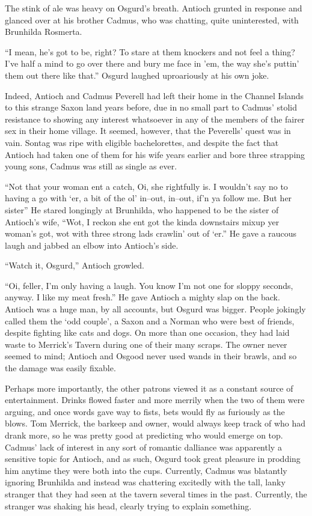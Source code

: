 The stink of ale was heavy on Osgurd’s breath. Antioch grunted in response and glanced over at his brother Cadmus, who was chatting, quite uninterested, with Brunhilda Rosmerta.

“I mean, he’s got to be, right? To stare at them knockers and not feel a thing? I’ve half a mind to go over there and bury me face in ’em, the way she’s puttin’ them out there like that.” Osgurd laughed uproariously at his own joke.

Indeed, Antioch and Cadmus Peverell had left their home in the Channel Islands to this strange Saxon land years before, due in no small part to Cadmus’ stolid resistance to showing any interest whatsoever in any of the members of the fairer sex in their home village. It seemed, however, that the Peverells’ quest was in vain. Sontag was ripe with eligible bachelorettes, and despite the fact that Antioch had taken one of them for his wife years earlier and bore three strapping young sons, Cadmus was still as single as ever.

“Not that your woman ent a catch, Oi, she rightfully is. I wouldn’t say no to having a go with ‘er, a bit of the ol’ in\mbox{--}out, in\mbox{--}out, if’n ya follow me. But her sister{\el}” He stared longingly at Brunhilda, who happened to be the sister of Antioch’s wife, “Wot, I reckon she ent got the kinda downstairs mixup yer woman’s got, wot with three strong lads crawlin’ out of ‘er.” He gave a raucous laugh and jabbed an elbow into Antioch’s side.

“Watch it, Osgurd,” Antioch growled.

“Oi, feller, I’m only having a laugh. You know I’m not one for sloppy seconds, anyway. I like my meat fresh.” He gave Antioch a mighty slap on the back. Antioch was a huge man, by all accounts, but Osgurd was bigger. People jokingly called them the ‘odd couple’, a Saxon and a Norman who were best of friends, despite fighting like cats and dogs. On more than one occasion, they had laid waste to Merrick’s Tavern during one of their many scraps. The owner never seemed to mind; Antioch and Osgood never used wands in their brawls, and so the damage was easily fixable.

Perhaps more importantly, the other patrons viewed it as a constant source of entertainment. Drinks flowed faster and more merrily when the two of them were arguing, and once words gave way to fists, bets would fly as furiously as the blows. Tom Merrick, the barkeep and owner, would always keep track of who had drank more, so he was pretty good at predicting who would emerge on top.
Cadmus’ lack of interest in any sort of romantic dalliance was apparently a sensitive topic for Antioch, and as such, Osgurd took great pleasure in prodding him anytime they were both into the cups. Currently, Cadmus was blatantly ignoring Brunhilda and instead was chattering excitedly with the tall, lanky stranger that they had seen at the tavern several times in the past. Currently, the stranger was shaking his head, clearly trying to explain something.

